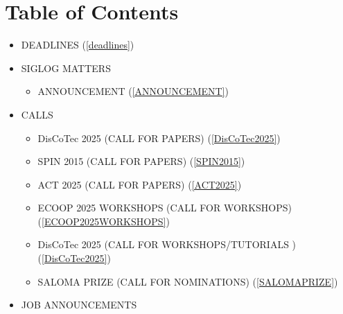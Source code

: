 \documentclass[prodmode,acmtecs]{acmsmall} %
\begin{document}
\section{Table of Contents}\begin{itemize}\item DEADLINES (\cref{deadlines}) 
 
\item SIGLOG MATTERS 
 
\begin{itemize}\item ANNOUNCEMENT (\cref{ANNOUNCEMENT})
\end{itemize} 
\item CALLS 
 
\begin{itemize}\item DisCoTec 2025 (CALL FOR PAPERS) (\cref{DisCoTec2025})
\item SPIN 2015 (CALL FOR PAPERS) (\cref{SPIN2015})
\item ACT 2025 (CALL FOR PAPERS) (\cref{ACT2025})
\item ECOOP 2025 WORKSHOPS (CALL FOR WORKSHOPS) (\cref{ECOOP2025WORKSHOPS})
\item DisCoTec 2025 (CALL FOR WORKSHOPS/TUTORIALS ) (\cref{DisCoTec2025})
\item SALOMA PRIZE (CALL FOR NOMINATIONS) (\cref{SALOMAPRIZE})
\end{itemize} 
\item JOB ANNOUNCEMENTS 
 

\end{itemize}
\end{document}
